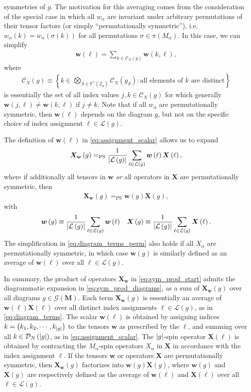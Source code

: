 \documentclass[nofootinbib,notitlepage,11pt]{revtex4-2}
\renewcommand{\t}{\text} %
\newcommand{\f}[2]{\dfrac{#1}{#2}} %
\newcommand{\p}[1]{\left(#1\right)} %
\renewcommand{\set}[1]{\left\{#1\right\}} %
\newcommand{\m}{\bm} %
\newcommand{\1}{\mathds{1}}
\newcommand{\C}{\mathcal{C}}
\newcommand{\D}{\mathcal{D}}
\newcommand{\G}{\mathcal{G}}
\renewcommand{\L}{\mathcal{L}}
\newcommand{\PP}{\mathbb{P}}
\newcommand{\ZZ}{\mathbb{Z}}
\newcommand{\EQPS}{=_{\text{PS}}}
\begin{document}
symmetries of $g$.  The motivation for this averaging comes from the
consideration of the special case in which all $w_\alpha$ are
invariant under arbitrary permutations of their tensor factors (or
simply ``permutationally symmetric''),
i.e.~$w_\alpha\p{k}=w_\alpha\p{\sigma\p{k}}$ for all permutations
$\sigma\in\pi\p{M_\alpha}$.  In this case, we can simplify
\begin{align}
  \m w\p{\ell} = \sum_{k\in\C_N\p{g}} \m w\p{k,\ell},
\end{align}
where
\begin{align}
  \C_N\p{g} \equiv
  \set{ k \in \bigotimes_{S\in\PP^*\p{\ZZ_p}} \C_N\p{g_S}
    : \t{all elements of $k$ are distinct} }
\end{align}
is essentially the set of all index values $j,k\in\C_N\p{g}$ for which
generally $\m w\p{j,\ell}\ne\m w\p{k,\ell}$ if $j\ne k$.  Note that if
all $w_\alpha$ are permutationally symmetric, then $\m w\p{\ell}$
depends on the diagram $g$, but not on the specific choice of index
assignment $\ell\in\L\p{g}$.

The definition of $\m w\p{\ell}$ in \eqref{eq:assignment_scalar}
allows us to expand
\begin{align}
  \m X_{\m w}\p{g} \EQPS \f1{\abs{\L\p{g}}}
  \sum_{\ell\in\L\p{g}} \m w\p{\ell} \m X\p{\ell},
  \label{eq:diagram_terms}
\end{align}
where if additionally all tensors in $\m w$ {\it or} all operators in
$\m X$ are permutationally symmetric, then
\begin{align}
  \m X_{\m w}\p{g} \EQPS \m w\p{g} \m X\p{g},
  \label{eq:diagram_terms_perm}
\end{align}
with
\begin{align}
  \m w\p{g} \equiv \f1{\abs{\L\p{g}}}
  \sum_{\ell\in\L\p{g}} \m w\p{\ell}
  &&
  \m X\p{g} \equiv \f1{\abs{\L\p{g}}}
  \sum_{\ell\in\L\p{g}} \m X\p{\ell}.
  \label{eq:assignment_averages}
\end{align}
The simplification in \eqref{eq:diagram_terms_perm} also holds if all
$X_\alpha$ are permutationally symmetric, in which case $\m w\p{g}$ is
similarly defined as an average of $\m w\p{\ell}$ over all
$\ell\in\L\p{g}$.

In summary, the product of operators $\m X_{\m w}$ in
\eqref{eq:sym_prod_start} admits the diagrammatic expansion in
\eqref{eq:sym_prod_diagrams}, as a sum of $\m X_{\m w}\p{g}$ over all
diagrams $g\in\G\p{\m M}$.  Each term $\m X_{\m w}\p{g}$ is
essentially an average of $\m w\p{\ell} \m X\p{\ell}$ over all
distinct index assignments $\ell\in\L\p{g}$, as in
\eqref{eq:diagram_terms}.  The scalar $\m w\p{\ell}$ is obtained by
assigning indices $k=\p{k_1,k_2,\cdots,k_{\abs{g}}}$ to the tensors
$\m w$ as prescribed by the $\ell$, and summing over all
$k\in\D_N\p{\abs{g}}$, as in \eqref{eq:assignment_scalar}.  The
$\abs{g}$-spin operator $\m X\p{\ell}$ is obtained by contracting the
$M_\alpha$-spin operators $X_\alpha$ in $\m X$ in accordance with the
index assignment $\ell$.  If the tensors $\m w$ or operators $\m X$
are permutationally symmetric, then $\m X_{\m w}\p{g}$ factorizes into
$\m w\p{g} \m X\p{g}$, where $\m w\p{g}$ and $\m X\p{g}$ are
respectively defined as the average of $\m w\p{\ell}$ and
$\m X\p{\ell}$ over all $\ell\in\L\p{g}$.
\end{document}
